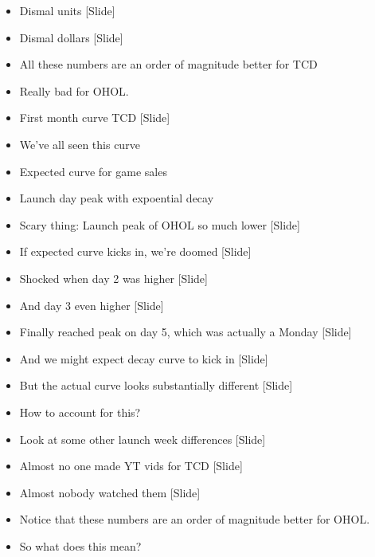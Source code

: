 \documentclass[12pt]{article}
\begin{document}
{\begin{itemize}
\item Dismal units [Slide]

\item Dismal dollars [Slide]

\item All these numbers are an order of magnitude better for TCD

\item Really bad for OHOL.

\item First month curve TCD [Slide]

\item We've all seen this curve

\item Expected curve for game sales

\item Launch day peak with expoential decay

\item Scary thing:  Launch peak of OHOL so much lower [Slide]

\item If expected curve kicks in, we're doomed [Slide]

\item Shocked when day 2 was higher [Slide]

\item And day 3 even higher [Slide]

\item Finally reached peak on day 5, which was actually a Monday [Slide]

\item And we might expect decay curve to kick in [Slide]

\item But the actual curve looks substantially different [Slide]

\item How to account for this?

\item Look at some other launch week differences [Slide]

\item Almost no one made YT vids for TCD [Slide]

\item Almost nobody watched them [Slide]

\item Notice that these numbers are an order of magnitude better for OHOL.

\item So what does this mean?


\end{itemize}}
\end{document}
